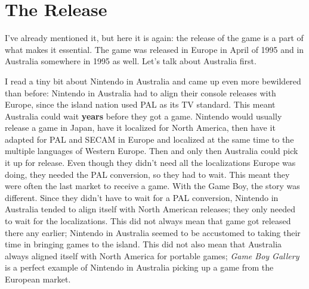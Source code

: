 \documentclass{book}
\begin{document}
\FloatBarrier\needspace{5pt}\section*{The Release}\nopagebreak[4]

I’ve already mentioned it, but here it is again: the release of the game is a part of what makes it essential. The game was released in Europe in April of 1995 and in Australia somewhere in 1995 as well. Let’s talk about Australia first.

I read a tiny bit about Nintendo in Australia and came up even more bewildered than before: Nintendo in Australia had to align their console releases with Europe, since the island nation used PAL as its TV standard. This meant Australia could wait \textbf{years} before they got a game. Nintendo would usually release a game in Japan, have it localized for North America, then have it adapted for PAL and SECAM in Europe and localized at the same time to the multiple languages of Western Europe. Then and only then Australia could pick it up for release. Even though they didn’t need all the localizations Europe was doing, they needed the PAL conversion, so they had to wait. This meant they were often the last market to receive a game. With the Game Boy, the story was different. Since they didn’t have to wait for a PAL conversion, Nintendo in Australia tended to align itself with North American releases; they only needed to wait for the localizations. This did not always mean that game got released there any earlier; Nintendo in Australia seemed to be accustomed to taking their time in bringing games to the island. This did not also mean that Australia always aligned itself with North America for portable games; \emph{Game Boy Gallery} is a perfect example of Nintendo in Australia picking up a game from the European market.
\end{document}
